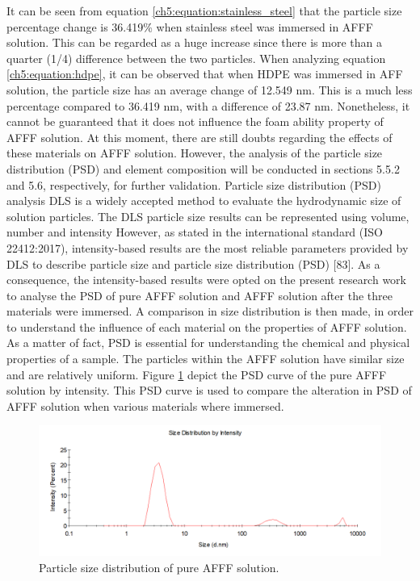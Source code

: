 \documentclass[12pt]{report}
\begin{document}
It can be seen from equation \ref{ch5:equation:stainless_steel} that the particle size percentage change is 36.419\% when stainless steel was immersed in AFFF solution. This can be regarded as a huge increase since there is more than a quarter (1/4) difference between the two particles. When analyzing equation \ref{ch5:equation:hdpe}, it can be observed that when HDPE was immersed in AFF solution, the particle size has an average change of 12.549 nm. This is a much less percentage compared to 36.419 nm, with a difference of 23.87 nm. Nonetheless, it cannot be guaranteed that it does not influence the foam ability property of AFFF solution.  At this moment, there are still doubts regarding the effects of these materials on AFFF solution. However, the analysis of the particle size distribution (PSD) and element composition will be conducted in sections 5.5.2 and 5.6, respectively, for further validation.
Particle size distribution (PSD) analysis 
DLS is a widely accepted method to evaluate the hydrodynamic size of solution particles. The DLS particle size results can be represented using volume, number and intensity However, as stated in the international standard (ISO 22412:2017), intensity-based results are the most reliable parameters provided by DLS to describe particle size and particle size distribution (PSD) [83]. As a consequence, the intensity-based results were opted on the present research work to analyse the PSD of pure AFFF solution and AFFF solution after the three materials were immersed. A comparison in size distribution is then made, in order to understand the influence of each material on the properties of AFFF solution. As a matter of fact, PSD is essential for understanding the chemical and physical properties of a sample. The particles within the AFFF solution have similar size and are relatively uniform. Figure \ref{ch5:figure:pure_afff} depict the PSD curve of the pure AFFF solution by intensity. This PSD curve is used to compare the alteration in PSD of AFFF solution when various materials where immersed. 

\begin{figure}[H]
    \centering
    \includegraphics[width=.8\textwidth]{particle_size_distribution_of_pure_afff_solution.png}
    \caption{Particle size distribution of pure AFFF solution.}
    \label{ch5:figure:pure_afff}
\end{figure}
\end{document}
